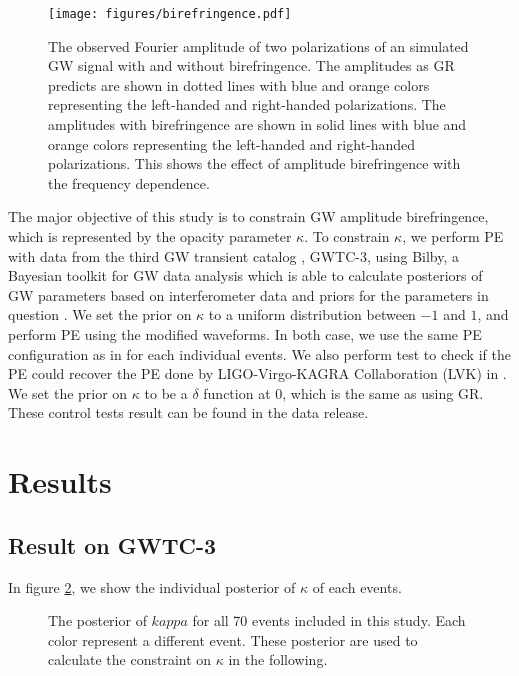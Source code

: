 \documentclass[reprint,amsmath,amssymb,aps,twocolumn]{aastex631}
\begin{document}
\begin{figure}[h]
    \texttt{[image: figures/birefringence.pdf]}
    \caption{
        The observed Fourier amplitude of two polarizations of an simulated GW signal with and without birefringence.
        The amplitudes as GR predicts are shown in dotted lines with blue and orange colors representing the left-handed and right-handed polarizations.
        The amplitudes with birefringence are shown in solid lines with blue and orange colors representing the left-handed and right-handed polarizations.
        This shows the effect of amplitude birefringence with the frequency dependence.
    }
    \label{fig:birefringence}
\end{figure}

The major objective of this study is to constrain GW amplitude birefringence, which is represented by the opacity parameter $\kappa$.
To constrain $\kappa$, we perform PE with data from the third GW transient catalog \citep{GWTC-2.1, GWTC-3}, GWTC-3, using Bilby, a Bayesian toolkit for GW data analysis which is able to calculate posteriors of GW parameters based on interferometer data and priors for the parameters in question \citep{Bilby}. 
We set the prior on $\kappa$ to a uniform distribution between $-1$ and $1$, and perform PE using the modified waveforms.
In both case, we use the same PE configuration as in \citet{GWTC-2.1, GWTC-3} for each individual events.
We also perform test to check if the PE could recover the PE done by LIGO-Virgo-KAGRA Collaboration (LVK) in \citet{GWTC-2.1, GWTC-3}.
We set the prior on $\kappa$ to be a $\delta$ function at $0$, which is the same as using GR.
These control tests result can be found in the data release.

\section{Results}
\label{sec:Results}

\subsection{Result on GWTC-3}
In figure \ref{fig:kappa_stacked}, we show the individual posterior of $\kappa$ of each events.

\begin{figure}[h]
    \caption{
        The posterior of $kappa$ for all 70 events included in this study.
        Each color represent a different event.
        These posterior are used to calculate the constraint on $\kappa$ in the following.
    }
    \label{fig:kappa_stacked}
\end{figure}
\end{document}
